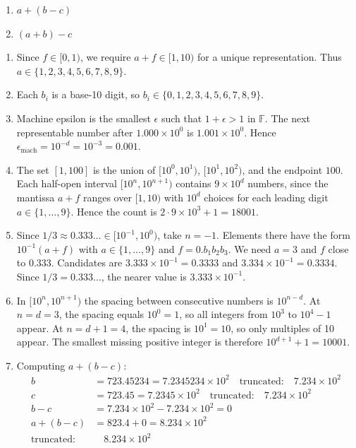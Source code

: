 \documentclass[reqno, answers]{exam}
\begin{document}
\begin{enumerate}
\begin{enumerate}[resume]
  \item $a + (b - c)$
  \item $(a + b) - c$
\end{enumerate}

\begin{solution}
\begin{enumerate}
  \item Since $f \in [0,1)$, we require $a + f \in [1, 10)$ for a unique representation. Thus $a \in \{1, 2, 3, 4, 5, 6, 7, 8, 9\}$.
  
  \item Each $b_i$ is a base-10 digit, so $b_i \in \{0, 1, 2, 3, 4, 5, 6, 7, 8, 9\}$.
  
  \item Machine epsilon is the smallest $\epsilon$ such that $1 + \epsilon > 1$ in $\mathbb{F}$. The next representable number after $1.000 \times 10^0$ is $1.001 \times 10^0$. Hence $\epsilon_{\text{mach}} = 10^{-d} = 10^{-3} = 0.001$.
  
  \item The set $[1, 100]$ is the union of $[10^0, 10^1)$, $[10^1, 10^2)$, and the endpoint $100$. Each half-open interval $[10^n, 10^{n+1})$ contains $9 \times 10^d$ numbers, since the mantissa $a + f$ ranges over $[1, 10)$ with $10^d$ choices for each leading digit $a \in \{1, \ldots, 9\}$. Hence the count is $2 \cdot 9 \times 10^3 + 1 = 18001$.
  
  \item Since $1/3 \approx 0.333\ldots \in [10^{-1}, 10^0)$, take $n = -1$. Elements there have the form $10^{-1}(a + f)$ with $a \in \{1, \ldots, 9\}$ and $f = 0.b_1 b_2 b_3$. We need $a = 3$ and $f$ close to $0.333$. Candidates are $3.333 \times 10^{-1} = 0.3333$ and $3.334 \times 10^{-1} = 0.3334$. Since $1/3 = 0.333\ldots$, the nearer value is $3.333 \times 10^{-1}$.
  
  \item In $[10^n, 10^{n+1})$ the spacing between consecutive numbers is $10^{n-d}$. At $n = d = 3$, the spacing equals $10^0 = 1$, so all integers from $10^3$ to $10^4 - 1$ appear. At $n = d + 1 = 4$, the spacing is $10^1 = 10$, so only multiples of 10 appear. The smallest missing positive integer is therefore $10^{d+1} + 1 = 10001$.
  
\item Computing $a + (b - c)$:
  \begin{align*}
    b &= 723.45234 = 7.2345234 \times 10^{2} \quad \text{truncated:} \quad 7.234 \times 10^{2} \\
    c &= 723.45 = 7.2345 \times 10^{2} \quad \text{truncated:} \quad 7.234 \times 10^{2} \\
    b - c &= 7.234 \times 10^{2} - 7.234 \times 10^{2} = 0 \\
    a + (b - c) &= 823.4 + 0 = 8.234 \times 10^{2} \\
    \text{truncated:} & \quad \boxed{8.234 \times 10^{2}}
  \end{align*}
  

\end{enumerate}
\end{solution}
\end{enumerate}
\end{document}
